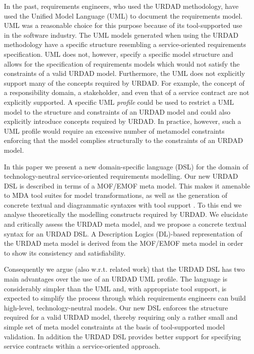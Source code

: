 In the past, requirements engineers, who used the URDAD methodology, have used the Unified Model Language (UML) to document the requirements model. UML was a reasonable choice for this purpose because of its tool-supported use in the software industry.  The UML models generated when using the URDAD methodology have a specific structure resembling a service-oriented requirements specification. UML does not, however, specify a specific model structure and allows for the specification of requirements models which would not satisfy the constraints of a valid URDAD model. Furthermore, the UML does not explicitly support many of the concepts required by URDAD. For example, the concept of a responsibility domain, a stakeholder, and even that of a service contract are not explicitly supported. A specific UML \emph{profile} could be used to restrict a UML model to the structure and constraints of an URDAD model and could also explicitly introduce concepts required by URDAD. In practice, however, such a UML profile would require an excessive number of metamodel constraints enforcing that the model complies structurally to the constraints of an URDAD model.

In this paper we present a new domain-specific language (DSL) for the domain of technology-neutral service-orien\-ted requirements modelling. Our new URDAD DSL is described in terms of a MOF/EMOF meta model. This makes it amenable to MDA tool suites for model transformations, as well as the generation of concrete textual and diagrammatic syntaxes with tool support \cite{gronback_model_2008}. To this end we analyse theoretically the modelling constructs required by URDAD. We elucidate and critically assess the URDAD meta model, and we propose a concrete textual syntax for an URDAD DSL. A Description Logics (DL)-based representation of the URDAD meta model is derived from the MOF/EMOF meta model in order to show its consistency and satisfiability.

Consequently we argue (also w.r.t. related work) that the URDAD DSL has two main advantages over the use of an URDAD UML profile. The language is considerably simpler than the UML and, with appropriate tool support, is expected to simplify the process through which requirements engineers can build high-level, technology-neutral models. Our new DSL enforces the structure required for a valid URDAD model, thereby requiring only a rather small and simple set of meta model constraints at the basis of tool-supported model validation. In addition the URDAD DSL provides better support for specifying service contracts within a service-oriented approach.

